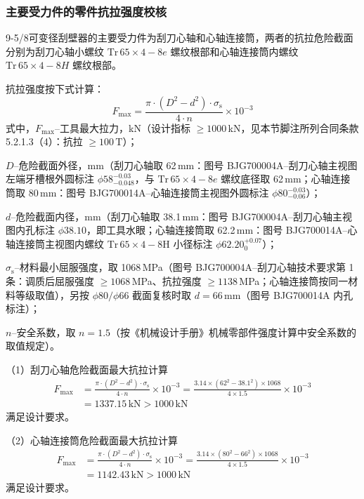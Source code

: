 \subsubsection{主要受力件的零件抗拉强度校核}

9-5/8\inch 可变径刮壁器的主要受力件为刮刀心轴和心轴连接筒，两者的抗拉危险截面分别为刮刀心轴小螺纹 $\mathrm{Tr}\,65 \times 4-8e$ 螺纹根部和心轴连接筒内螺纹 $\mathrm{Tr}\,65 \times 4-8H$ 螺纹根部。

抗拉强度按下式计算：
\begin{equation}
    F_{\max} = \frac{\pi \cdot (D^2 - d^2) \cdot \sigma_{\mathrm{s}}}{4 \cdot n} \times 10^{-3}
\end{equation}
式中，$F_{\max}$--工具最大拉力，kN（设计指标 $\ge 1000$\,kN，见本节脚注所列合同条款 5.2.1.3（4）：抗拉 $\ge 100$\,T）；

$D$--危险截面外径，mm（刮刀心轴取 62\,mm：图号 BJG700004A--刮刀心轴主视图左端牙槽根外圆标注 $\phi 58^{-0.03}_{-0.048}$，与 $\mathrm{Tr}\,65\times4-8e$ 螺纹底径取 62\,mm；心轴连接筒取 80\,mm：图号 BJG700014A--心轴连接筒主视图外圆标注 $\phi 80^{-0.03}_{-0.06}$）；

$d$--危险截面内径，mm（刮刀心轴取 38.1\,mm：图号 BJG700004A--刮刀心轴主视图内孔标注 $\phi 38.10$，即工具水眼；心轴连接筒取 62.2\,mm：图号 BJG700014A--心轴连接筒主视图内螺纹 $\mathrm{Tr}\,65\times4-8\mathrm{H}$ 小径标注 $\phi 62.20^{+0.07}_0$）；

$\sigma_{\mathrm{s}}$--材料最小屈服强度，取 1068\,MPa（图号 BJG700004A--刮刀心轴技术要求第 1 条：调质后屈服强度 $\ge 1068$\,MPa、抗拉强度 $\ge 1138$\,MPa；心轴连接筒按同一材料等级取值），另按 $\phi 80/\phi 66$ 截面复核时取 $d = 66\,\text{mm}$（图号 BJG700014A 内孔标注）；

$n$--安全系数，取 $n = 1.5$（按《机械设计手册》机械零部件强度计算中安全系数的取值规定\cite{ref26}）。

（1）刮刀心轴危险截面最大抗拉计算
\begin{equation}
    \begin{aligned}
    F_{\max} &= \frac{\pi \cdot (D^2 - d^2) \cdot \sigma_{\mathrm{s}}}{4 \cdot n} \times 10^{-3}
             = \frac{3.14 \times (62^2 - 38.1^2) \times 1068}{4 \times 1.5} \times 10^{-3} \\
             &= 1337.15\,\mathrm{kN} > 1000\,\mathrm{kN}
    \end{aligned}
\end{equation}
满足设计要求。

（2）心轴连接筒危险截面最大抗拉计算
\begin{equation}
    \begin{aligned}
    F_{\max} &= \frac{\pi \cdot (D^2 - d^2) \cdot \sigma_{\mathrm{s}}}{4 \cdot n} \times 10^{-3}
             = \frac{3.14 \times (80^2 - 66^2) \times 1068}{4 \times 1.5} \times 10^{-3} \\
             &= 1142.43\,\mathrm{kN} > 1000\,\mathrm{kN}
    \end{aligned}
\end{equation}
满足设计要求。

